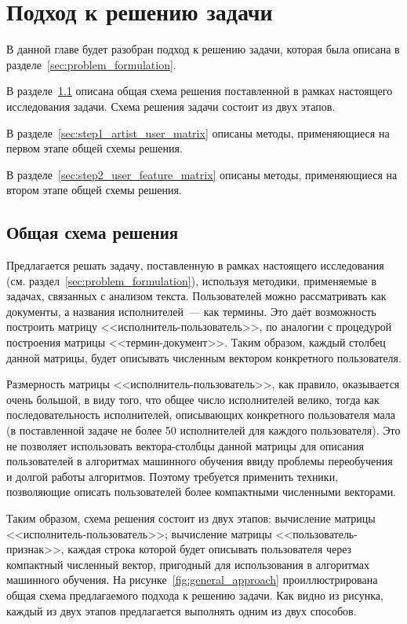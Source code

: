 \chapter{Подход к решению задачи}
\label{ch:problem_solving}

В данной главе будет разобран подход к решению задачи,
которая была описана в разделе~\ref{sec:problem_formulation}.

В разделе~\ref{sec:general_approach} описана общая схема
решения поставленной в рамках настоящего исследования задачи.
Схема решения задачи состоит из двух этапов.

В разделе~\ref{sec:step1_artist_user_matrix} описаны методы,
применяющиеся на первом этапе общей схемы решения.

В разделе~\ref{sec:step2_user_feature_matrix} описаны методы,
применяющиеся на втором этапе общей схемы решения.

\section{Общая схема решения}
\label{sec:general_approach}

Предлагается решать задачу, поставленную в рамках настоящего
исследования (см. раздел~\ref{sec:problem_formulation}),
используя методики, применяемые в задачах, связанных с анализом
текста. Пользователей можно рассматривать как документы, а
названия исполнителей~--- как термины. Это даёт возможность
построить матрицу <<исполнитель-пользователь>>, по аналогии
с процедурой построения матрицы <<термин-документ>>. Таким
образом, каждый столбец данной матрицы, будет описывать
численным вектором конкретного пользователя.

Размерность матрицы <<исполнитель-пользователь>>, как
правило, оказывается очень большой, в виду того, что
общее число исполнителей велико, тогда как последовательность
исполнителей, описывающих конкретного пользователя мала
(в поставленной задаче не более 50 исполнителей для каждого
пользователя). Это не позволяет использовать вектора-столбцы
данной матрицы для описания пользователей в алгоритмах
машинного обучения ввиду проблемы переобучения и долгой
работы алгоритмов. Поэтому требуется применить техники,
позволяющие описать пользователей более компактными
численными векторами.

Таким образом, схема решения состоит из двух этапов:
вычисление матрицы <<исполнитель-пользователь>>; вычисление
матрицы <<пользователь-признак>>, каждая строка которой
будет описывать пользователя через компактный численный вектор,
пригодный для использования в алгоритмах машинного обучения.
На рисунке~\ref{fig:general_approach} проиллюстрирована
общая схема предлагаемого подхода к решению задачи. Как видно
из рисунка, каждый из двух этапов предлагается
выполнять одним из двух способов.

